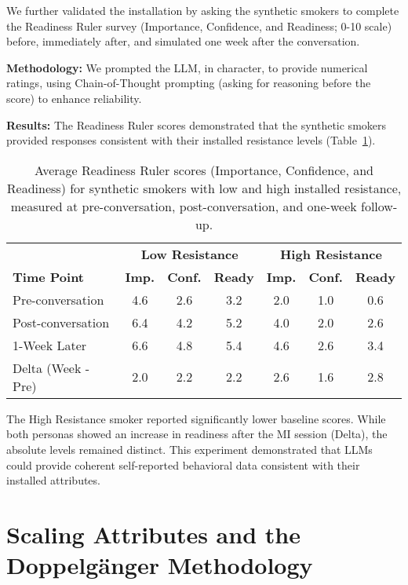 We further validated the installation by asking the synthetic smokers to complete the Readiness Ruler survey (Importance, Confidence, and Readiness; 0-10 scale) before, immediately after, and simulated one week after the conversation.

\textbf{Methodology:} We prompted the LLM, in character, to provide numerical ratings, using Chain-of-Thought prompting (asking for reasoning before the score) to enhance reliability.

\textbf{Results:} The Readiness Ruler scores demonstrated that the synthetic smokers provided responses consistent with their installed resistance levels (Table~\ref{tab:resistance-readiness-rulers}).

\begin{table}[h!]
\centering
\caption[Readiness Rulers for High/Low Resistance Smokers]{Average Readiness Ruler scores (Importance, Confidence, and Readiness) for synthetic smokers with low and high installed resistance, measured at pre-conversation, post-conversation, and one-week follow-up.}
\label{tab:resistance-readiness-rulers}
\begin{tabular}{@{}l|ccc|ccc@{}}
\toprule
 & \multicolumn{3}{c|}{\textbf{Low Resistance}} & \multicolumn{3}{c}{\textbf{High Resistance}} \\
\textbf{Time Point} & \textbf{Imp.} & \textbf{Conf.} & \textbf{Ready} & \textbf{Imp.} & \textbf{Conf.} & \textbf{Ready} \\ \midrule
Pre-conversation & 4.6 & 2.6 & 3.2 & 2.0 & 1.0 & 0.6 \\
Post-conversation & 6.4 & 4.2 & 5.2 & 4.0 & 2.0 & 2.6 \\
1-Week Later & 6.6 & 4.8 & 5.4 & 4.6 & 2.6 & 3.4 \\ \midrule
Delta (Week - Pre) & 2.0 & 2.2 & 2.2 & 2.6 & 1.6 & 2.8 \\ \bottomrule
\end{tabular}
\end{table}

The High Resistance smoker reported significantly lower baseline scores. While both personas showed an increase in readiness after the MI session (Delta), the absolute levels remained distinct. This experiment demonstrated that LLMs could provide coherent self-reported behavioral data consistent with their installed attributes.

\section{Scaling Attributes and the Doppelgänger Methodology}
\label{sec:synthetic-smoker-doppelganger}

